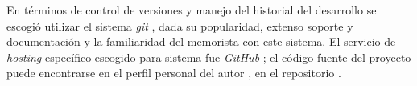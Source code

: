 En términos de control de versiones y manejo del historial del desarrollo se escogió utilizar el sistema \emph{git} \autocite{git}, dada su popularidad, extenso soporte y documentación y la familiaridad del memorista con este sistema. El servicio de \emph{hosting} específico escogido para sistema fue \emph{GitHub} \autocite{github}; el código fuente del proyecto puede encontrarse en el perfil personal del autor \autocite{molguin_github}, en el repositorio \autocite{pveins_github}.